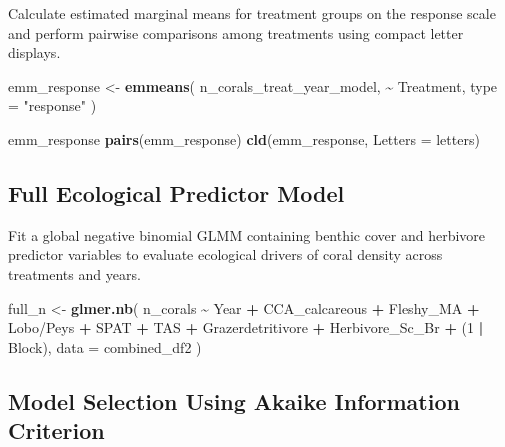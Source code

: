 \documentclass[
]{article}
\newenvironment{Shaded}{\begin{snugshade}}{\end{snugshade}}
\newcommand{\AttributeTok}[1]{\textcolor[rgb]{0.13,0.29,0.53}{#1}}
\newcommand{\DecValTok}[1]{\textcolor[rgb]{0.00,0.00,0.81}{#1}}
\newcommand{\FunctionTok}[1]{\textcolor[rgb]{0.13,0.29,0.53}{\textbf{#1}}}
\newcommand{\NormalTok}[1]{#1}
\newcommand{\OtherTok}[1]{\textcolor[rgb]{0.56,0.35,0.01}{#1}}
\newcommand{\SpecialCharTok}[1]{\textcolor[rgb]{0.81,0.36,0.00}{\textbf{#1}}}
\newcommand{\StringTok}[1]{\textcolor[rgb]{0.31,0.60,0.02}{#1}}
\begin{document}
Calculate estimated marginal means for treatment groups on the response
scale and perform pairwise comparisons among treatments using compact
letter displays.

\begin{Shaded}
\begin{Highlighting}[]
\NormalTok{emm\_response }\OtherTok{\textless{}{-}} \FunctionTok{emmeans}\NormalTok{(}
\NormalTok{  n\_corals\_treat\_year\_model,}
  \SpecialCharTok{\textasciitilde{}}\NormalTok{ Treatment,}
  \AttributeTok{type =} \StringTok{"response"}
\NormalTok{)}

\NormalTok{emm\_response}
\FunctionTok{pairs}\NormalTok{(emm\_response)}
\FunctionTok{cld}\NormalTok{(emm\_response, }\AttributeTok{Letters =}\NormalTok{ letters)}
\end{Highlighting}
\end{Shaded}

\subsection{Full Ecological Predictor
Model}\label{full-ecological-predictor-model-1}

Fit a global negative binomial GLMM containing benthic cover and
herbivore predictor variables to evaluate ecological drivers of coral
density across treatments and years.

\begin{Shaded}
\begin{Highlighting}[]
\NormalTok{full\_n }\OtherTok{\textless{}{-}} \FunctionTok{glmer.nb}\NormalTok{(}
\NormalTok{  n\_corals }\SpecialCharTok{\textasciitilde{}}
\NormalTok{    Year }\SpecialCharTok{+}
\NormalTok{    CCA\_calcareous }\SpecialCharTok{+}
\NormalTok{    Fleshy\_MA }\SpecialCharTok{+}
    \StringTok{\textasciigrave{}}\AttributeTok{Lobo/Peys}\StringTok{\textasciigrave{}} \SpecialCharTok{+}
\NormalTok{    SPAT }\SpecialCharTok{+}
\NormalTok{    TAS }\SpecialCharTok{+}
\NormalTok{    Grazerdetritivore }\SpecialCharTok{+}
\NormalTok{    Herbivore\_Sc\_Br }\SpecialCharTok{+}
\NormalTok{    (}\DecValTok{1} \SpecialCharTok{|}\NormalTok{ Block),}
  \AttributeTok{data =}\NormalTok{ combined\_df2}
\NormalTok{)}
\end{Highlighting}
\end{Shaded}

\subsection{Model Selection Using Akaike Information
Criterion}\label{model-selection-using-akaike-information-criterion-1}
\end{document}

